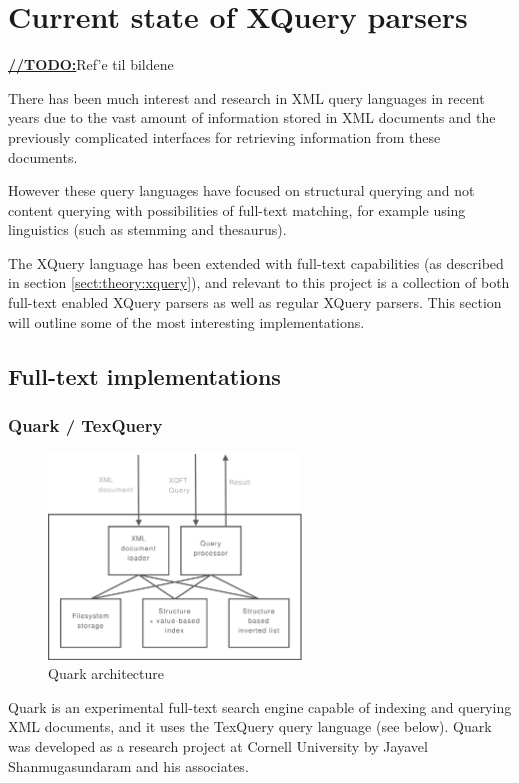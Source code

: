 \section{Current state of XQuery parsers}

\underline{\textbf{\LARGE //TODO:}}Ref'e til bildene

There has been much interest and research in XML query languages in recent
years due to the vast amount of information stored in XML documents and the
previously complicated interfaces for retrieving information from these documents.

However these query languages have focused on structural querying and not
content querying with possibilities of full-text matching, for example using
linguistics (such as stemming and thesaurus).

The XQuery language has been extended with full-text capabilities (as described
in section \ref{sect:theory:xquery}), and relevant to this project is a
collection of both full-text enabled XQuery parsers as well as regular XQuery
parsers. This section will outline some of the most interesting implementations.

\subsection{Full-text implementations}
\subsubsection{Quark / TexQuery}
\begin{figure}[!h]
  \centering
    \includegraphics[width=0.6\textwidth]{diagrams/quark_arch}
  \caption{Quark architecture}
\end{figure}

Quark is an experimental full-text search engine capable of indexing and
querying XML documents, and it uses the TexQuery query language (see below). 
Quark was developed as a research project at Cornell University by Jayavel 
Shanmugasundaram and his associates.

